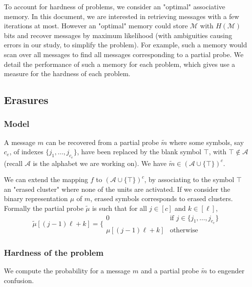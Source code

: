 \documentclass[english,10pt,twocolumn]{IEEEtran}
\theoremstyle{definition}
\begin{document}
	To account for hardness of problems, we consider an "optimal" associative memory. In this document, we are interested in retrieving messages with a few iterations at most. However an "optimal" memory could store $\mathcal{M}$ with $H(\mathcal{M})$ bits and recover messages by maximum likelihood (with ambiguities causing errors in our study, to simplify the problem). For example, such a memory would scan over all messages to find all messages corresponding to a partial probe. We detail the performance of such a memory for each problem, which gives use a measure for the hardness of each problem.
	
	\subsection{Erasures}
	
	\subsubsection{Model}
	
	A message $m$ can be recovered from a partial probe $\tilde{m}$ where some symbols, say $c_e$, of indexes $\{j_1, \dots , j_{c_e} \}$, have been replaced by the blank symbol $\intercal$, with $\intercal \not\in\mathcal{A}$ (recall $\mathcal{A}$ is the alphabet we are working on).  We have $\tilde{m} \in \left( \mathcal{A} \cup \{ \intercal \}\right)^c$.
	
	We can extend the mapping $f$ to $\left( \mathcal{A} \cup \{ \intercal \}\right)^c$, by associating to the symbol $\intercal$ an "erased cluster" where none of the units are activated. If we consider the binary representation $\mu$ of $m$, erased symbols corresponds to erased clusters. %
	Formally the partial probe $\tilde{\mu}$ is such that for all $j\in [c]$ and $k \in [\ell ]$, \[ 
		\tilde{\mu}[(j-1)\ell+k] = \bigg \{ \begin{array}{cl} 0 & \mbox{if } j\in \{j_1, \dots , j_{c_e} \}\\
													\mu[(j-1)\ell+k] & \mbox{otherwise}	
	\end{array}\]
	
	
	

	\subsubsection{Hardness of the problem}
	
	We compute the probability for a message $m$ and a partial probe $\tilde{m}$ to engender confusion.
	
\end{document}
